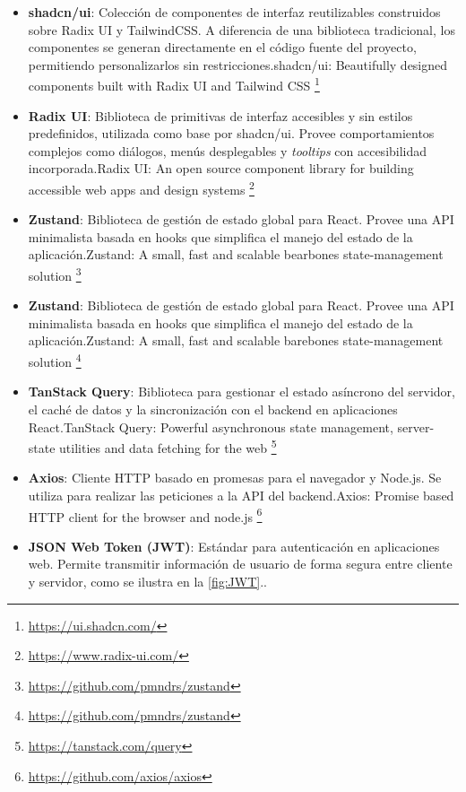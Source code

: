 \begin{itemize}
\item \textbf{shadcn/ui}: Colección de componentes de interfaz reutilizables construidos sobre Radix UI y TailwindCSS. A diferencia de una biblioteca tradicional, los componentes se generan directamente en el código fuente del proyecto, permitiendo personalizarlos sin restricciones.shadcn/ui: Beautifully designed components built with Radix UI and Tailwind CSS \footnote{\url{https://ui.shadcn.com/}}

\item \textbf{Radix UI}: Biblioteca de primitivas de interfaz accesibles y sin estilos predefinidos, utilizada como base por shadcn/ui. Provee comportamientos complejos como diálogos, menús desplegables y \textit{tooltips} con accesibilidad incorporada.Radix UI: An open source component library for building accessible web apps and design systems \footnote{\url{https://www.radix-ui.com/}}

\item \textbf{Zustand}: Biblioteca de gestión de estado global para React. Provee una API minimalista basada en hooks que simplifica el manejo del estado de la aplicación.Zustand: A small, fast and scalable bearbones state-management solution \footnote{\url{https://github.com/pmndrs/zustand}}
\item \textbf{Zustand}: Biblioteca de gestión de estado global para React. Provee una API minimalista basada en hooks que simplifica el manejo del estado de la aplicación.Zustand: A small, fast and scalable barebones state-management solution \footnote{\url{https://github.com/pmndrs/zustand}}

\item \textbf{TanStack Query}: Biblioteca para gestionar el estado asíncrono del servidor, el caché de datos y la sincronización con el backend en aplicaciones React.{TanStack Query}: Powerful asynchronous state management, server-state utilities and data fetching for the web \footnote{\url{https://tanstack.com/query}}

\item \textbf{Axios}: Cliente HTTP basado en promesas para el navegador y Node.js. Se utiliza para realizar las peticiones a la API del backend.Axios: Promise based {HTTP} client for the browser and node.js \footnote{\url{https://github.com/axios/axios}}

\item \textbf{JSON Web Token (JWT)}: Estándar para autenticación en aplicaciones web. Permite transmitir información de usuario de forma segura entre cliente y servidor, como se ilustra en la \autoref{fig:JWT}.\cite{misc_jwt}.


\end{itemize}
